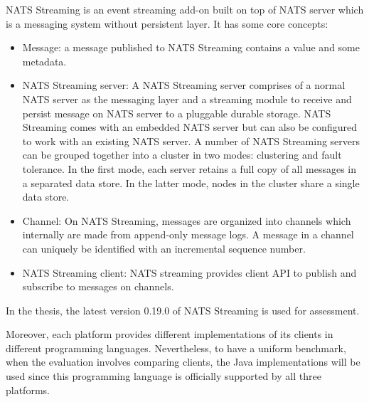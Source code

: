 NATS Streaming is an event streaming add-on built on top of NATS server which is a messaging system without persistent layer. It has some core concepts:
\begin{itemize}
	\item Message: a message published to NATS Streaming contains a value and some metadata.
	\item NATS Streaming server: A NATS Streaming server comprises of a normal NATS server as the messaging layer and a streaming module to receive and persist message on NATS server to a pluggable durable storage. NATS Streaming comes with an embedded NATS server but can also be configured to work with an existing NATS server. A number of NATS Streaming servers can be grouped together into a cluster in two modes: clustering and fault tolerance. In the first mode, each server retains a full copy of all messages in a separated data store. In the latter mode, nodes in the cluster share a single data store.
	\item Channel: On NATS Streaming, messages are organized into channels which internally are made from append-only message logs. A message in a channel can uniquely be identified with an incremental sequence number.
	\item NATS Streaming client: NATS streaming provides client API to publish and subscribe to messages on channels.  
\end{itemize}
In the thesis, the latest version 0.19.0 of NATS Streaming is used for assessment.

Moreover, each platform provides different implementations of its clients in different programming languages. Nevertheless, to have a uniform benchmark, when the evaluation involves comparing clients, the Java implementations will be used since this programming language is officially supported by all three platforms.







